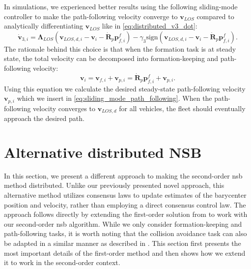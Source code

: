 In simulations, we experienced better results using the following sliding-mode controller to make the path-following velocity converge to $\mathbf{v}_{LOS}$ compared to analytically differentiating $\mathbf{v}_{LOS}$ like in \eqref{eq:distributed_v3_dot}:
\begin{equation}\label{eq:sliding_mode_path_following}
    \dot{\mathbf{v}}_{3,i} = \bm{\Lambda}_{LOS}(\mathbf{v}_{LOS,d,i} - \mathbf{v}_i - \dot{\mathbf{R}}_p \mathbf{p}_{f,i}^f) - \gamma_3\mathrm{sign}(\mathbf{v}_{LOS,d,i} - \mathbf{v}_i - \dot{\mathbf{R}}_p \mathbf{p}_{f,i}^f).
\end{equation}
The rationale behind this choice is that when the formation task is at steady state, the total velocity can be decomposed into formation-keeping and path-following velocity:
\begin{equation}
    \mathbf{v}_i = \mathbf{v}_{f,i} +  \mathbf{v}_{p,i} = \dot{\mathbf{R}}_p \mathbf{p}_{f,i}^f + \mathbf{v}_{p,i}.
\end{equation}
Using this equation we calculate the desired steady-state path-following velocity $\mathbf{v}_{p,i}$ which we insert in \eqref{eq:sliding_mode_path_following}. When the path-following velocity converges to $\mathbf{v}_{LOS,d}$ for all vehicles, the fleet should eventually approach the desired path.

\section{Alternative distributed NSB}\label{sec:alternative_distributed}
In this section, we present a different approach to making the second-order \gls{nsb} method distributed. Unlike our previously presented novel approach, this alternative method utilizes consensus laws to update estimates of the barycenter position and velocity, rather than employing a direct consensus control law. The approach follows directly by extending the first-order solution from \cite{matous_formation_2023} to work with our second-order \gls{nsb} algorithm. While we only consider formation-keeping and path-following tasks, it is worth noting that the collision avoidance task can also be adapted in a similar manner as described in \cite{matous_formation_2023}. This section first presents the most important details of the first-order method and then shows how we extend it to work in the second-order context.


